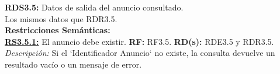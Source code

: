 \textcolor{azul}{\textbf{RDS3.5:}} Datos de salida del anuncio consultado. \\
\hspace*{1cm} Los mismos datos que RDR3.5. \\[12pt]
 
\textbf{\textcolor{verde}{Restricciones Semánticas:}} \\[6pt]
\textbf{\textcolor{verde}{\underline{RS3.5.1:}}} El anuncio debe existir. \textbf{RF:} RF3.5. \textbf{RD(s):} RDE3.5 y RDR3.5. \\
\hspace*{1cm} \textit{Descripción:} Si el `Identificador Anuncio` no existe, la consulta devuelve un resultado vacío o un mensaje de error.








